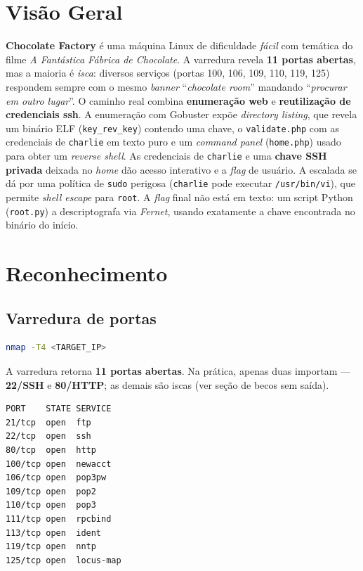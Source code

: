 \documentclass[12pt,a4paper]{article}
\begin{document}
\section{Visão Geral}
\textbf{Chocolate Factory} é uma máquina Linux de dificuldade \emph{fácil} com
temática do filme \emph{A Fantástica Fábrica de Chocolate}. A varredura revela
\textbf{11 portas abertas}, mas a maioria é \emph{isca}: diversos serviços
(portas 100, 106, 109, 110, 119, 125) respondem sempre com o mesmo \emph{banner}
``\emph{chocolate room}'' mandando ``\emph{procurar em outro lugar}''. O caminho
real combina \textbf{enumeração web} e \textbf{reutilização
de credenciais ssh}. A enumeração com Gobuster expõe \emph{directory listing}, que
revela um binário ELF (\texttt{key\_rev\_key}) contendo uma chave, o
\texttt{validate.php} com as credenciais de \texttt{charlie} em texto puro e um
\emph{command panel} (\texttt{home.php}) usado para obter um \emph{reverse
shell}. As credenciais de \texttt{charlie} e uma \textbf{chave SSH privada}
deixada no \emph{home} dão acesso interativo e a \emph{flag} de usuário. A
escalada se dá por uma política de \texttt{sudo} perigosa (\texttt{charlie} pode
executar \texttt{/usr/bin/vi}), que permite \emph{shell escape} para
\texttt{root}. A \emph{flag} final não está em texto: um script Python
(\texttt{root.py}) a descriptografa via \emph{Fernet}, usando exatamente a chave
encontrada no binário do início.

\section{Reconhecimento}

\subsection{Varredura de portas}
\begin{lstlisting}[language=bash,caption={Varredura de portas e serviços com Nmap.}]
nmap -T4 <TARGET_IP>
\end{lstlisting}

A varredura retorna \textbf{11 portas abertas}. Na prática, apenas duas
importam ---  \textbf{22/SSH} e \textbf{80/HTTP}; as demais são
iscas (ver seção de becos sem saída).

\begin{lstlisting}[style=output,caption={Portas abertas retornadas pela varredura.}]
PORT    STATE SERVICE
21/tcp  open  ftp
22/tcp  open  ssh
80/tcp  open  http
100/tcp open  newacct
106/tcp open  pop3pw
109/tcp open  pop2
110/tcp open  pop3
111/tcp open  rpcbind
113/tcp open  ident
119/tcp open  nntp
125/tcp open  locus-map
\end{lstlisting}
\end{document}
